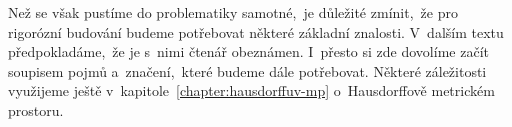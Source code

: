 Než se však pustíme do problematiky samotné,~je důležité zmínit,~že pro rigorózní budování budeme potřebovat některé základní znalosti. V~dalším textu předpokladáme,~že je s~nimi čtenář obeznámen. I~přesto si zde dovolíme začít soupisem pojmů a~značení,~které budeme dále potřebovat. Některé záležitosti využijeme ještě v~kapitole~\ref{chapter:hausdorffuv-mp} o~Hausdorffově metrickém prostoru.





